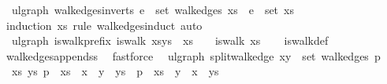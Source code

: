 \begin{isabellebody}
\endisatagproof
{\isafoldproof}%
%
\isadelimproof
\isanewline
%
\endisadelimproof
\isanewline
{}\isamarkupfalse%
\ {\isacharparenleft}{\kern0pt}\ ulgraph{\isacharparenright}{\kern0pt}\ walk{\isacharunderscore}{\kern0pt}edges{\isacharunderscore}{\kern0pt}in{\isacharunderscore}{\kern0pt}verts{\isacharcolon}{\kern0pt}\ {\isachardoublequoteopen}e\ {\isasymin}\ set\ {\isacharparenleft}{\kern0pt}walk{\isacharunderscore}{\kern0pt}edges\ xs{\isacharparenright}{\kern0pt}\ {\isasymLongrightarrow}\ e\ {\isasymsubseteq}\ set\ xs{\isachardoublequoteclose}\isanewline
%
\isadelimproof
\ \ %
\endisadelimproof
%
\isatagproof
{}\isamarkupfalse%
\ {\isacharparenleft}{\kern0pt}induction\ xs\ rule{\isacharcolon}{\kern0pt}\ walk{\isacharunderscore}{\kern0pt}edges{\isachardot}{\kern0pt}induct{\isacharparenright}{\kern0pt}\ auto%
\endisatagproof
{\isafoldproof}%
%
\isadelimproof
\isanewline
%
\endisadelimproof
\isanewline
{}\isamarkupfalse%
\ {\isacharparenleft}{\kern0pt}\ ulgraph{\isacharparenright}{\kern0pt}\ is{\isacharunderscore}{\kern0pt}walk{\isacharunderscore}{\kern0pt}prefix{\isacharcolon}{\kern0pt}\ {\isachardoublequoteopen}is{\isacharunderscore}{\kern0pt}walk\ {\isacharparenleft}{\kern0pt}xs{\isacharat}{\kern0pt}ys{\isacharparenright}{\kern0pt}\ {\isasymLongrightarrow}\ xs\ {\isasymnoteq}\ {\isacharbrackleft}{\kern0pt}{\isacharbrackright}{\kern0pt}\ {\isasymLongrightarrow}\ is{\isacharunderscore}{\kern0pt}walk\ xs{\isachardoublequoteclose}\isanewline
%
\isadelimproof
\ \ %
\endisadelimproof
%
\isatagproof
{}\isamarkupfalse%
\ is{\isacharunderscore}{\kern0pt}walk{\isacharunderscore}{\kern0pt}def\ \isamarkupfalse%
\ walk{\isacharunderscore}{\kern0pt}edges{\isacharunderscore}{\kern0pt}append{\isacharunderscore}{\kern0pt}ss{}\ \isamarkupfalse%
\ fastforce%
\endisatagproof
{\isafoldproof}%
%
\isadelimproof
\isanewline
%
\endisadelimproof
\isanewline
{}\isamarkupfalse%
\ {\isacharparenleft}{\kern0pt}\ ulgraph{\isacharparenright}{\kern0pt}\ split{\isacharunderscore}{\kern0pt}walk{\isacharunderscore}{\kern0pt}edge{\isacharcolon}{\kern0pt}\ {\isachardoublequoteopen}{\isacharbraceleft}{\kern0pt}x{\isacharcomma}{\kern0pt}y{\isacharbraceright}{\kern0pt}\ {\isasymin}\ set\ {\isacharparenleft}{\kern0pt}walk{\isacharunderscore}{\kern0pt}edges\ p{\isacharparenright}{\kern0pt}\ {\isasymLongrightarrow}\isanewline
\ \ {\isasymexists}xs\ ys{\isachardot}{\kern0pt}\ p\ {\isacharequal}{\kern0pt}\ xs\ {\isacharat}{\kern0pt}\ x\ {\isacharhash}{\kern0pt}\ y\ {\isacharhash}{\kern0pt}\ ys\ {\isasymor}\ p\ {\isacharequal}{\kern0pt}\ xs\ {\isacharat}{\kern0pt}\ y\ {\isacharhash}{\kern0pt}\ x\ {\isacharhash}{\kern0pt}\ ys{\isachardoublequoteclose}\isanewline

\end{isabellebody}
